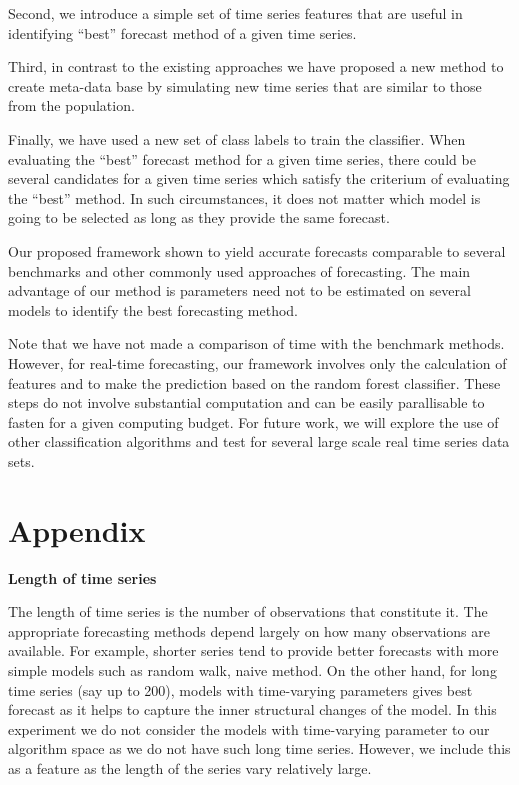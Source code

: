 \documentclass[11pt,a4paper,]{article}
\theoremstyle{definition}
\theoremstyle{definition}
\theoremstyle{definition}
\theoremstyle{remark}
\begin{document}
Second, we introduce a simple set of time series features that are
useful in identifying ``best'' forecast method of a given time series.

Third, in contrast to the existing approaches we have proposed a new
method to create meta-data base by simulating new time series that are
similar to those from the population.

Finally, we have used a new set of class labels to train the classifier.
When evaluating the ``best'' forecast method for a given time series,
there could be several candidates for a given time series which satisfy
the criterium of evaluating the ``best'' method. In such circumstances,
it does not matter which model is going to be selected as long as they
provide the same forecast.

Our proposed framework shown to yield accurate forecasts comparable to
several benchmarks and other commonly used approaches of forecasting.
The main advantage of our method is parameters need not to be estimated
on several models to identify the best forecasting method.

Note that we have not made a comparison of time with the benchmark
methods. However, for real-time forecasting, our framework involves only
the calculation of features and to make the prediction based on the
random forest classifier. These steps do not involve substantial
computation and can be easily parallisable to fasten for a given
computing budget. For future work, we will explore the use of other
classification algorithms and test for several large scale real time
series data sets.

\newpage

\section*{Appendix}\label{appendix}

\textbf{Length of time series}

The length of time series is the number of observations that constitute
it. The appropriate forecasting methods depend largely on how many
observations are available. For example, shorter series tend to provide
better forecasts with more simple models such as random walk, naive
method. On the other hand, for long time series (say up to 200), models
with time-varying parameters gives best forecast as it helps to capture
the inner structural changes of the model. In this experiment we do not
consider the models with time-varying parameter to our algorithm space
as we do not have such long time series. However, we include this as a
feature as the length of the series vary relatively large.
\end{document}
